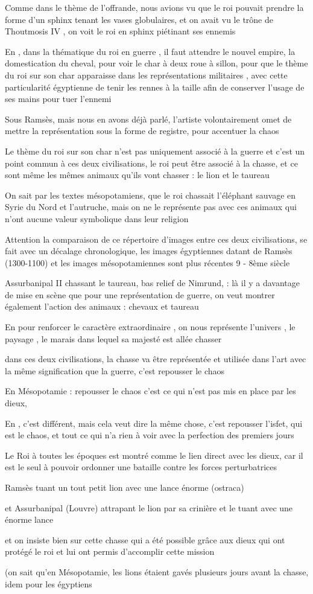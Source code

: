 \documentclass[a4paper]{article}
\begin{document}
Comme dans le thème de l'offrande, nous avions vu que
le roi pouvait prendre la forme d'un sphinx  tenant
les vases globulaires, et on avait vu le trône de Thoutmosis IV , on
voit le roi en sphinx piétinant ses ennemis


En \kmt, dans la thématique du roi en guerre , il faut attendre le
nouvel empire, la domestication du cheval, pour voir le char à deux
roue à sillon, pour que le thème du roi sur son char apparaisse dans
les représentations militaires , avec cette particularité égyptienne de
tenir les rennes à la taille afin de conserver l'usage
de ses mains pour tuer l'ennemi


Sous Ramsès, mais nous en avons déjà parlé, l'artiste
volontairement omet de mettre la représentation sous la forme de
registre, pour accentuer la chaos


Le thème du roi sur son char n'est pas uniquement
associé à la guerre et c'est un point commun à ces
deux civilisations, le roi peut être associé à la chasse, et ce sont
même les mêmes animaux qu'ils vont chasser : le lion
et le taureau


On sait par les textes mésopotamiens, que le roi chassait
l'éléphant sauvage en Syrie du Nord et
l'autruche, mais on ne le représente pas avec ces
animaux qui n'ont aucune valeur symbolique dans leur
religion


Attention la comparaison de ce répertoire d'images
entre ces deux civilisations, se fait avec un décalage chronologique,
les images égyptiennes datant de  Ramsès (1300-1100) et les  images
mésopotamiennes sont plus récentes 9 - 8ème siècle


Assurbanipal II chassant le taureau, bas relief de Nimrund, : là il y a
davantage de mise en scène que pour une représentation de guerre, on
veut montrer également l'action des animaux : chevaux
et taureau


En \kmt pour renforcer le caractère extraordinaire , on nous
représente l'univers  , le paysage , le marais dans
lequel sa majesté est allée chasser


dans ces deux civilisations, la chasse va être représentée et utilisée
dans l'art avec la même signification que la guerre,
c'est repousser le chaos


En Mésopotamie : repousser le chaos c'est ce qui
n'est pas mis en place par les dieux, 


En \kmt, c'est différent, mais cela veut dire la même
chose, c'est repousser l'isfet, qui
est le chaos, et tout ce qui n'a rien à voir avec la
perfection des premiers jours


Le Roi à toutes les époques est montré comme le lien direct avec les
dieux, car il est le seul à pouvoir ordonner une bataille contre les
forces perturbatrices 


Ramsès tuant un tout petit lion avec une lance énorme (ostraca)


et Assurbanipal (Louvre) attrapant le lion par sa crinière et le tuant
avec une énorme lance


et on insiste bien sur cette chasse qui a été possible grâce aux dieux
qui ont protégé le roi et lui ont permis d'accomplir
cette mission


(on sait qu'en Mésopotamie, les lions étaient gavés
plusieurs jours avant la chasse, idem pour les égyptiens
\end{document}
